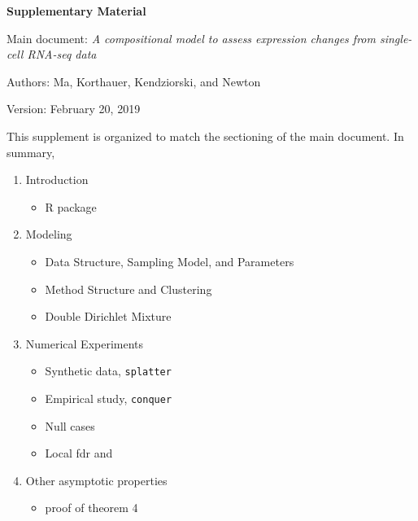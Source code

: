 \documentclass[aoas,preprint]{imsart}
\begin{document}
\large
\centerline{\bf Supplementary Material }

\noindent
Main document: {\em A compositional model to assess expression changes from single-cell RNA-seq data}

\vspace{.2in}
\noindent
Authors: Ma, Korthauer, Kendziorski, and Newton

\vspace{.2in}
\noindent
Version: February 20, 2019

\vspace{.4in}

\noindent
This supplement is organized to match the sectioning of the main document.   In summary,

\begin{enumerate}
\item Introduction
   \begin{itemize}
   \item R package
   \end{itemize}
\item Modeling
 \begin{itemize}
  \item Data Structure, Sampling Model, and Parameters
  \item Method Structure and Clustering 
  \item Double Dirichlet Mixture
  \end{itemize}
\item Numerical Experiments
   \begin{itemize}
   \item Synthetic data, \verb+splatter+
   \item Empirical study, \verb+conquer+
   \item Null cases 
   \item Local fdr and 
   \end{itemize}
\item Other asymptotic properties
  \begin{itemize}
   \item proof of theorem 4
  \end{itemize}
\end{enumerate}
\end{document}
